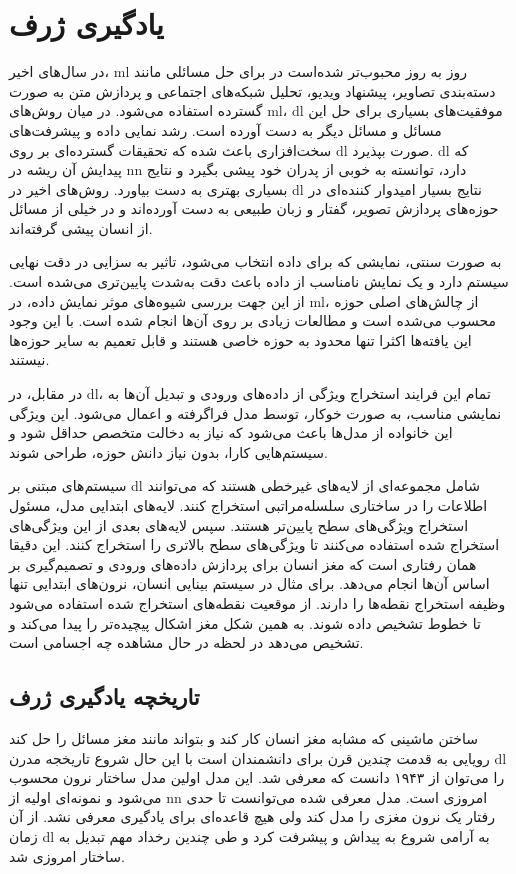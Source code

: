 \section{یادگیری ژرف}
در سال‌های اخیر، \gls{ml} روز به روز محبوب‌تر شده‌است در برای حل مسائلی مانند
دسته‌بندی تصاویر، پیشنهاد ویدیو، تحلیل شبکه‌های اجتماعی و پردازش متن به صورت
گسترده استفاده می‌شود. در میان روش‌های \gls{ml}، \gls{dl} موفقیت‌های بسیاری برای
حل این مسائل و مسائل دیگر به دست آورده است. رشد نمایی داده و پیشرفت‌های
سخت‌افزاری باعث شده که تحقیقات گسترده‌ای بر روی \gls{dl} صورت بپذیرد. \gls{dl}
که پیدایش آن ریشه در \gls{nn} دارد، توانسته به خوبی از پدران خود پیشی بگیرد و
نتایج بسیاری بهتری به دست بیاورد. روش‌های اخیر در \gls{dl} نتایج بسیار امیدوار
کننده‌ای در حوزه‌های پردازش تصویر، گفتار و زبان طبیعی به دست آورده‌اند و در خیلی
از مسائل از انسان پیشی گرفته‌اند.

به صورت سنتی، نمایشی که برای داده انتخاب می‌شود، تاثیر به سزایی در دقت
نهایی سیستم دارد و یک نمایش نامناسب از داده باعث دقت به‌شدت پایین‌تری می‌شده
است. از این جهت بررسی شیوه‌های موثر نمایش داده، در \gls{ml}، از چالش‌های اصلی
حوزه محسوب می‌شده است و مطالعات زیادی بر روی آن‌ها انجام شده است. با این وجود
این یافته‌ها اکثرا تنها محدود به حوزه خاصی هستند و قابل تعمیم به سایر حوزه‌ها
نیستند.

در مقابل، در \gls{dl}، تمام این فرایند استخراج ویژگی از داده‌های ورودی و تبدیل
آن‌ها به نمایشی مناسب، به صورت خوکار، توسط مدل فراگرفته و اعمال می‌شود. این
ویژگی این خانواده از مدل‌ها باعث می‌شود که نیاز به دخالت متخصص حداقل شود و
سیستم‌هایی کارا، بدون نیاز دانش حوزه، طراحی شوند.

سیستم‌های مبتنی بر \gls{dl} شامل مجموعه‌ای از لایه‌های غیرخطی هستند که می‌توانند
اطلاعات را در ساختاری سلسله‌مراتبی استخراج کنند. لایه‌های ابتدایی مدل، مسئول
استخراج ویژگی‌های سطح پایین‌تر هستند. سپس لایه‌های بعدی از این ویژگی‌های استخراج
شده استفاده می‌کنند تا ویژگی‌های سطح بالاتری را استخراج کنند. این دقیقا همان
رفتاری است که مغز انسان برای پردازش داده‌های ورودی و تصمیم‌گیری بر اساس آن‌ها
انجام می‌دهد. برای مثال در سیستم بینایی انسان، نرون‌های ابتدایی تنها وظیفه
استخراج نقطه‌ها را دارند. از موقعیت نقطه‌های استخراج شده استفاده می‌شود تا خطوط
تشخیص داده شوند. به همین شکل مغز اشکال پیچیده‌تر را پیدا می‌کند و تشخیص می‌دهد
در لحظه در حال مشاهده چه اجسامی است.

\subsection{تاریخچه یادگیری ژرف}
ساختن ماشینی که مشابه مغز انسان کار کند و بتواند مانند مغز مسائل را حل کند
رویایی به قدمت چندین قرن برای دانشمندان است با این حال شروع تاریخجه مدرن
\gls{dl} را می‌توان از ۱۹۴۳ دانست که  معرفی شد. این مدل
اولین مدل ساختار نرون محسوب می‌شود و نمونه‌ای اولیه از \gls{nn} امروزی است. مدل
معرفی شده می‌توانست تا حدی رفتار یک نرون مغزی را مدل کند ولی هیچ قاعده‌ای برای
یادگیری معرفی نشد. از آن زمان \gls{dl} به آرامی شروع به پیداش و پیشرفت کرد و طی
چندین رخداد مهم تبدیل به ساختار امروزی شد.

